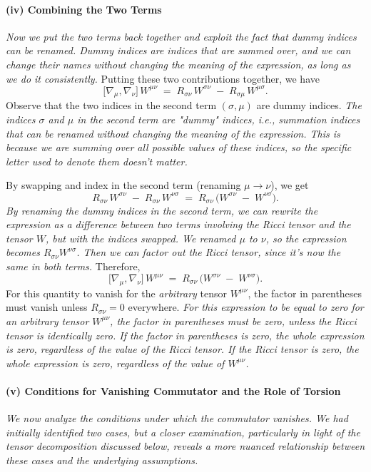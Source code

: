 \paragraph{(iv) Combining the Two Terms}
\textit{Now we put the two terms back together and exploit the fact that dummy indices can be renamed. Dummy indices are indices that are summed over, and we can change their names without changing the meaning of the expression, as long as we do it consistently.}
Putting these two contributions together, we have
\[
\bigl[\nabla_{\mu}, \nabla_{\nu}\bigr]\,W^{\mu\nu}
\;=\;
R_{\sigma\nu}\,W^{\sigma\nu}
\;-\;
R_{\sigma\mu}\,W^{\mu\sigma}.
\]
Observe that the two indices in the second term $(\sigma,\mu)$ are dummy indices.
\textit{The indices \(\sigma\) and \(\mu\) in the second term are "dummy" indices, i.e., summation indices that can be renamed without changing the meaning of the expression. This is because we are summing over all possible values of these indices, so the specific letter used to denote them doesn't matter.}

By swapping and index in the second term (renaming $\mu\to\nu$), we get
\[
R_{\sigma\nu}\,W^{\sigma\nu}
\;-\;
R_{\sigma\nu}\,W^{\nu\sigma}
\;=\;
R_{\sigma\nu}\,
\bigl(W^{\sigma\nu} \;-\; W^{\nu\sigma}\bigr).
\]
\textit{By renaming the dummy indices in the second term, we can rewrite the expression as a difference between two terms involving the Ricci tensor and the tensor \(W\), but with the indices swapped. We renamed \(\mu\) to \(\nu\), so the expression becomes \(R_{\sigma\nu}W^{\nu\sigma}\). Then we can factor out the Ricci tensor, since it's now the same in both terms.}
Therefore,
\[
\bigl[\nabla_{\mu}, \nabla_{\nu}\bigr]\,W^{\mu\nu} \;=\;
R_{\sigma\nu}\,\bigl(W^{\sigma\nu} \;-\; W^{\nu\sigma}\bigr).
\]
For this quantity to vanish for the \emph{arbitrary} tensor $W^{\mu\nu}$, the factor in parentheses must vanish unless $R_{\sigma\nu}=0$ everywhere.
\textit{For this expression to be equal to zero for an arbitrary tensor \(W^{\mu\nu}\), the factor in parentheses must be zero, unless the Ricci tensor is identically zero. If the factor in parentheses is zero, the whole expression is zero, regardless of the value of the Ricci tensor. If the Ricci tensor is zero, the whole expression is zero, regardless of the value of \(W^{\mu\nu}\).}

\paragraph{(v) Conditions for Vanishing Commutator and the Role of Torsion}
\textit{We now analyze the conditions under which the commutator vanishes. We had initially identified two cases, but a closer examination, particularly in light of the tensor decomposition discussed below, reveals a more nuanced relationship between these cases and the underlying assumptions.}

